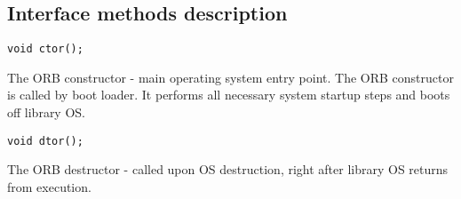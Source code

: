\documentclass[onecolumn]{article}
\begin{document}
\subsection{Interface methods description}
\label{sec-if-desc}

\small\begin{verbatim}void ctor();\end{verbatim}\normalsize

\par The ORB constructor - main operating system entry point. The ORB
constructor is called by boot loader. It performs all necessary system
startup steps and boots off library OS.

\small\begin{verbatim}void dtor();\end{verbatim}\normalsize

\par The ORB destructor - called upon OS destruction, right after library OS
returns from execution.

\small



\end{document}
